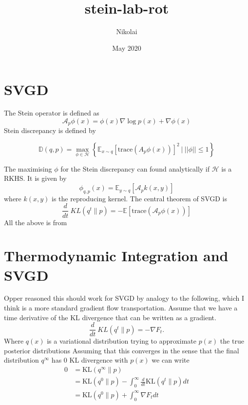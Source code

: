 \documentclass{article}
\title{stein-lab-rot}
\author{Nikolai }
\date{May 2020}
\begin{document}
\maketitle

\section{SVGD}
The Stein operator is defined as
\begin{equation}
    \label{eq:stein_operator}
    \mathcal{A}_p \phi(x) = \phi(x) \nabla \log p(x) + \nabla \phi(x)
\end{equation}
Stein discrepancy is defined by

\begin{equation}
    \label{eq:stein_discrepancy}
    \mathbb{D}( q, p ) = \max_{ \phi \in \mathcal{H} } 
    \left\{ 
      \mathbb{E}_{ x \sim q } 
        \left[ 
            \text{trace} ( A_p \phi(x) ) 
        \right]^2
        \ | \ ||\phi|| \leq 1 
    \right\}
\end{equation}

The maximising $\phi$ for the Stein discrepancy can found analytically if $\mathcal{H}$ is a RKHS. It is given by
\begin{equation}
    \label{eq:phi_max}
    \phi_{ q, p } (x) = \mathbb{E}_{ y \sim q } \left[ \mathcal{A}_p k(x, y) \right]
\end{equation}
where $k(x,y)$ is the reproducing kernel.
The central theorem of SVGD is
\begin{equation}
    \label{eq:svgd}
    \frac{d}{dt}\ KL( q^t \| p ) = - \mathbb{E} \left[ \text{trace} \left( \mathcal{A}_p \phi(x) \right) \right]
\end{equation}
All the above is from \cite{svgd}


\section{Thermodynamic Integration and SVGD}
Opper reasoned this should work for SVGD by analogy to the following, which I think is a more standard gradient
flow transportation. Assume that we have a time derivative of the KL divergence that can be written as a gradient.
\begin{equation}
    \frac{d}{dt}\ KL( q^t \| p ) = - \nabla F_t.
\end{equation}
Where $q(x)$ is a variational distribution trying to approximate $p(x)$ the true posterior distributions
Assuming that this converges in the sense that the final distribution $q^{\infty}$ has 0 KL divergence with 
$p(x)$ we can write
\begin{align}
\label{eq:therm_int}
0 &= \text{KL}( q^{\infty} \| p ) \\
&= \text{KL} ( q^0 \| p ) - \int_0^{\infty} \frac{d}{dt} \text{KL} ( q^t \| p ) dt \\
&= \text{KL}( q^0 \| p ) + \int_0^{\infty} \nabla F_t dt
\end{align}
\end{document}
